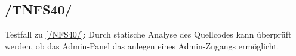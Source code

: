 \subsection*{/TNFS40/}

\label{/TNFS40/} Testfall zu \ref{/NFS40/}: Durch \gls{statische Analyse} des \Gls{Quellcode}s kann überprüft werden, ob das \Gls{Admin-Panel} das anlegen eines \Gls{Admin-Zugang}s ermöglicht.